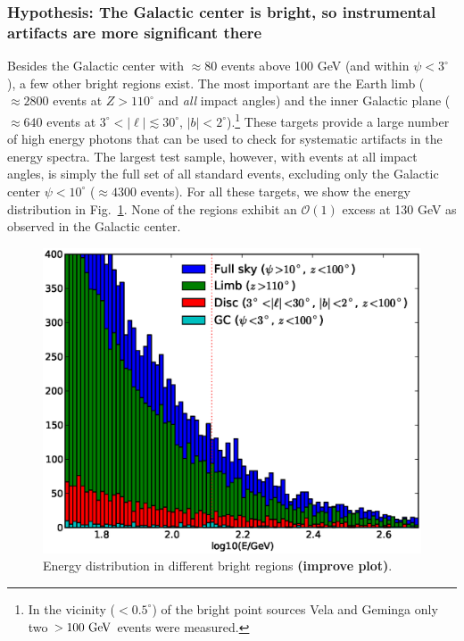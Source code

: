 \documentclass[aps,twocolumn,prd,superscriptaddress,showpacs,nofootinbib,fixfloat]{revtex4}
\newcommand{\GeV}{{\rm ~GeV}}
\begin{document}
\subsubsection{Hypothesis: The Galactic center is bright, so instrumental
artifacts are more significant there}

Besides
the Galactic center with $\approx80$ events above 100 GeV (and within
$\psi<3^\circ$), a few other bright regions exist.  The most important are the
Earth limb ($\approx2800$ events at $Z>110^\circ$ and \emph{all} impact
angles) and the inner Galactic plane ($\approx640$ events at
$3^\circ<|\ell|\lesssim30^\circ$, $|b|<2^\circ$).\footnote{In the vicinity
($<0.5^\circ$) of the bright point
sources Vela and Geminga only two $>100\GeV$ events were measured.} These
targets provide a large number of high energy photons that can be used to
check for systematic artifacts in the energy spectra. The largest test sample,
however, with events at all impact angles, is simply the full set of all
standard events, excluding only the Galactic center $\psi<10^\circ$ ($\approx
4300$ events). For all these targets, we show the energy distribution in
Fig.~\ref{fig:target_spectra}.  None of the regions exhibit an
$\mathcal{O}(1)$ excess at 130 GeV as observed in the Galactic center.

\begin{figure}
\centering
\includegraphics[width=1.0\linewidth]{plots/target_spectra.eps}
\caption{Energy distribution in different bright regions \textbf{(improve
plot)}.}
\label{fig:target_spectra}
\end{figure}
\end{document}
